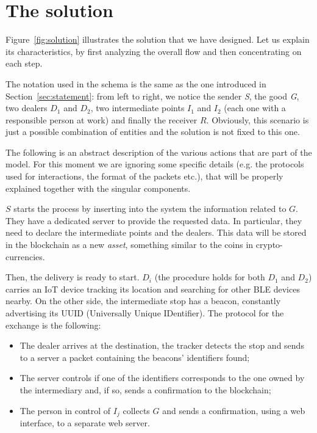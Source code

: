 \chapter{The solution}
\label{cha:main}

Figure~\ref{fig:solution} illustrates the solution that we have designed. Let us explain its characteristics, by first analyzing the overall flow and then concentrating on each step.

The notation used in the schema is the same as the one introduced in Section~\ref{sec:statement}: from left to right, we notice the sender \textit{S}, the good \textit{G}, two dealers $D_1$ and $D_2$, two intermediate points $I_1$ and $I_2$ (each one with a responsible person at work) and finally the receiver $R$. Obviously, this scenario is just a possible combination of entities and the solution is not fixed to this one.

The following is an abstract description of the various actions that are part of the model. For this moment we are ignoring some specific details (e.g. the protocols used for interactions, the format of the packets etc.), that will be properly explained together with the singular components.

$S$ starts the process by inserting into the system the information related to $G$. They have a dedicated server to provide the requested data. In particular, they need to declare the intermediate points and the dealers. This data will be stored in the blockchain as a new \emph{asset}, something similar to the coins in crypto-currencies. 

Then, the delivery is ready to start. $D_i$ (the procedure holds for both $D_1$ and $D_2$) carries an IoT device tracking its location and searching for other BLE devices nearby. On the other side, the intermediate stop has a beacon, constantly advertising its UUID (Universally Unique IDentifier). The protocol for the exchange is the following: 
\begin{itemize}
    \item The dealer arrives at the destination, the tracker detects the stop and sends to a server a packet containing the beacons' identifiers found;
    \item The server controls if one of the identifiers corresponds to the one owned by the intermediary and, if so, sends a confirmation to the blockchain;
    \item The person in control of $I_j$ collects $G$ and sends a confirmation, using a web interface, to a separate web server.
\end{itemize}

